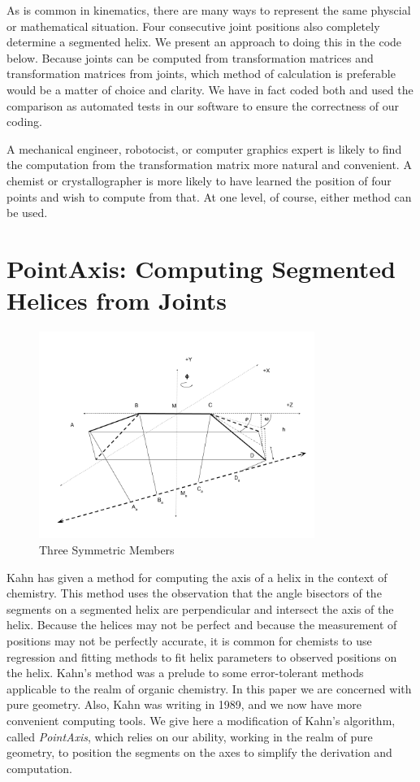 \documentclass[11pt]{article}
\begin{document}
{As is common in kinematics\cite{funda1990computational}, there are many ways to represent
the same physcial or mathematical situation.
Four consecutive joint positions also completely determine a segmented helix.
We present an approach to doing this in the code below.
Because joints can be computed from transformation matrices and transformation matrices from joints,
which method of calculation is preferable would be a matter of choice and clarity. We have
in fact coded both and used the comparison as automated tests in our software to ensure
the correctness of our coding.

A mechanical engineer, robotocist, or computer graphics expert is likely to find the computation from the
transformation matrix more natural and convenient. A chemist or crystallographer is more likely to
have learned the position of four points and wish to compute from that. At one level, of course,
either method can be used.

\section{PointAxis: Computing Segmented Helices from Joints}

\begin{figure}
     \centering
     \includegraphics[width=0.80\textwidth]{figures/TwoAngleDiagram.png}
     \caption{Three Symmetric Members}
  \label{fig:threemembersdiagram}
\end{figure}

Kahn\cite{kahn1989defining} has given a method for computing the axis of a helix in the context of chemistry.
This method uses the observation that the angle bisectors of the segments on a segmented helix are perpendicular
and intersect the axis of the helix.
Because the helices may not be perfect and because the measurement of positions may not be perfectly accurate,
it is common for chemists to use regression and fitting methods to fit helix parameters to observed positions
on the helix.
Kahn's method was a prelude to some error-tolerant methods applicable to
the realm of organic chemistry.
In this paper we are concerned with pure geometry. Also, Kahn was writing in 1989,
and we now have more convenient computing tools. We give here a modification of Kahn's algorithm, called {\em PointAxis},
which relies on our ability, working in the realm of pure geometry, to position the segments on the axes
to simplify the derivation and computation.

}
\end{document}
